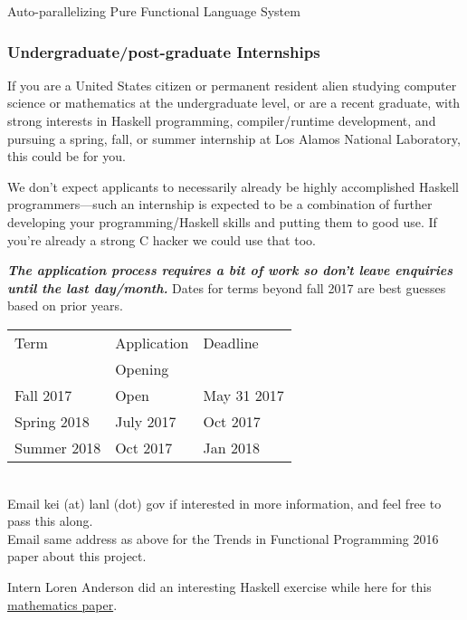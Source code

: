 \begin{hcarentry}[updated]{Auto-parallelizing Pure Functional Language System}
\subsubsection*{Undergraduate/post-graduate Internships}

If you are a United States citizen or permanent resident alien studying
computer science or mathematics at the undergraduate level, or are a recent
graduate, with strong interests in Haskell programming, compiler/runtime
development, and pursuing a spring, fall, or summer internship at Los Alamos
National Laboratory, this could be for you.

We don't expect applicants to necessarily already be highly accomplished
Haskell programmers---such an internship is expected to be a combination of
further developing your programming/Haskell skills and putting them to good
use.  If you're already a strong C hacker we could use that too.

\emph{\bfseries The application process requires a bit of work so don't leave
enquiries until the last day/month.}  Dates for terms beyond fall 2017 are
best guesses based on prior years.\\

\begin{tabular}{l||l||l}
Term & Application & Deadline \\
     & Opening &  \\
\hline
Fall 2017    & Open      & May 31 2017 \\
Spring 2018  & July 2017 & Oct 2017 \\
Summer 2018  & Oct 2017  & Jan 2018 \\
\end{tabular}\\

\noindent Email kei (at) lanl (dot) gov if interested in more
information, and feel free to pass this along. \\

\FurtherReading
Email same address as above for the Trends in Functional Programming 2016
paper about this project.

Intern Loren Anderson did an interesting Haskell exercise while here for this
\href{http://ijmcs.future-in-tech.net/11.1/R-Anderson.pdf}{mathematics paper}.
\end{hcarentry}
